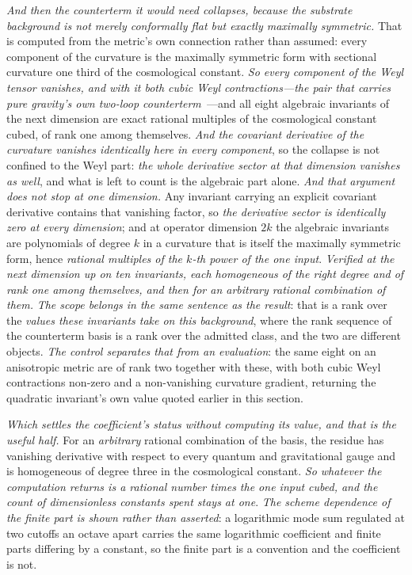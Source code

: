 \documentclass[11pt,a4paper]{article}
\theoremstyle{plain}
\theoremstyle{definition}
\theoremstyle{remark}
\begin{document}
\emph{And then the counterterm it would need collapses, because the substrate background is not merely
conformally flat but exactly maximally symmetric.} That is computed from the metric's own connection rather
than assumed: every component of the curvature is the maximally symmetric form with sectional curvature one
third of the cosmological constant. \emph{So every component of the Weyl tensor vanishes, and with it both
cubic Weyl contractions---the pair that carries pure gravity's own two-loop counterterm~\cite{GoroffSagnotti1986}}---and all eight
algebraic invariants of the next dimension are exact rational multiples of the cosmological constant cubed,
of rank one among themselves. \emph{And the covariant derivative of the curvature vanishes identically here
in every component}, so the collapse is not confined to the Weyl part: \emph{the whole derivative sector at
that dimension vanishes as well}, and what is left to count is the algebraic part alone. \emph{And that
argument does not stop at one dimension.} Any invariant carrying an explicit covariant derivative contains
that vanishing factor, so \emph{the derivative sector is identically zero at every dimension}; and at
operator dimension $2k$ the algebraic invariants are polynomials of degree $k$ in a curvature that is itself
the maximally symmetric form, hence \emph{rational multiples of the $k$-th power of the one input}.
\emph{Verified at the next dimension up on ten invariants, each homogeneous of the right degree and of rank
one among themselves, and then for an arbitrary rational combination of them.} \emph{The scope belongs in
the same sentence as the result}: that is a rank over the \emph{values these invariants take on this
background}, where the rank sequence of the counterterm basis is a rank over the admitted class, and the two
are different objects. \emph{The control separates that from an evaluation}: the same eight on an
anisotropic metric are of rank two together with these, with both cubic Weyl contractions non-zero and a
non-vanishing curvature gradient, returning the quadratic invariant's own value quoted earlier in this
section.

\emph{Which settles the coefficient's status without computing its value, and that is the useful half.} For
an \emph{arbitrary} rational combination of the basis, the residue has vanishing derivative with respect to
every quantum and gravitational gauge and is homogeneous of degree three in the cosmological constant.
\emph{So whatever the computation returns is a rational number times the one input cubed, and the count of
dimensionless constants spent stays at one}.
\emph{The scheme dependence of the finite part is shown rather than asserted}: a logarithmic mode sum
regulated at two cutoffs an octave apart carries the same logarithmic coefficient and finite parts
differing by a constant, so the finite part is a convention and the coefficient is not.
\end{document}
